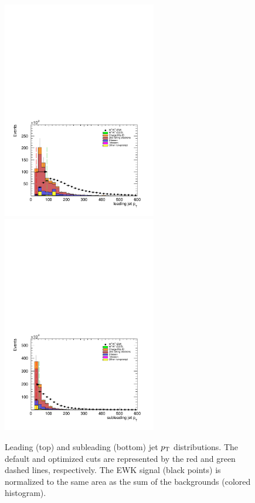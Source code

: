 \begin{figure}[htp]
  \centering
  \includegraphics[width=0.6\textwidth]{figs/ssww_upgrade/optimization_plots/jet0pt}\\
  \includegraphics[width=0.6\textwidth]{figs/ssww_upgrade/optimization_plots/jet1pt}
  \caption{Leading (top) and subleading (bottom) jet $p_{\mathrm{T}}$ distributions.  The default and optimized cuts are represented by the red and green dashed lines, respectively.  The \ssww EWK signal (black points) is normalized to the same area as the sum of the backgrounds (colored histogram).}
  \label{fig:optimized_jetpt}
\end{figure}

